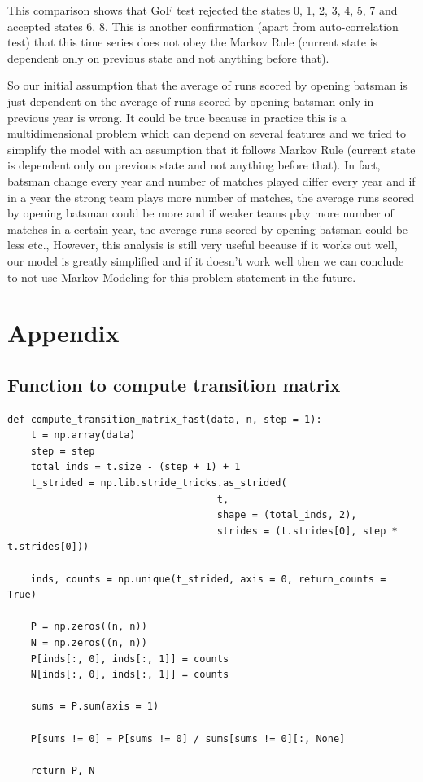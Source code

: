 \documentclass[a4paper, article, oneside, UKenglish]{memoir}
\newcommand{\0}{\mathbf{0}}
\newcommand{\1}{\mathbf{1}}
\begin{document}
This comparison shows that GoF test rejected the states 0, 1, 2, 3, 4, 5, 7 and accepted states 6, 8. This is another confirmation (apart from auto-correlation test) that this time series does not obey the Markov Rule (current state is dependent only on previous state and not anything before that).

So our initial assumption that the average of runs scored by opening batsman is just dependent on the average of runs scored by opening batsman only in previous year is wrong. It could be true because in practice this is a multidimensional problem which can depend on several features and we tried to simplify the model with an assumption that it follows Markov Rule (current state is dependent only on previous state and not anything before that). In fact, batsman change every year and number of matches played differ every year and if in a year the strong team plays more number of matches, the average runs scored by opening batsman could be more and if weaker teams play more number of matches in a certain year, the average runs scored by opening batsman could be less etc., However, this analysis is still very useful because if it works out well, our model is greatly simplified and if it doesn't work well then we can conclude to not use Markov Modeling for this problem statement in the future.


\chapter{Appendix}

\section{Function to compute transition matrix}
\label{sec:tm}
\begin{verbatim}
def compute_transition_matrix_fast(data, n, step = 1):
    t = np.array(data)
    step = step
    total_inds = t.size - (step + 1) + 1
    t_strided = np.lib.stride_tricks.as_strided(
                                    t,
                                    shape = (total_inds, 2),
                                    strides = (t.strides[0], step * t.strides[0]))
    
    inds, counts = np.unique(t_strided, axis = 0, return_counts = True)

    P = np.zeros((n, n))
    N = np.zeros((n, n))
    P[inds[:, 0], inds[:, 1]] = counts
    N[inds[:, 0], inds[:, 1]] = counts
    
    sums = P.sum(axis = 1)
    
    P[sums != 0] = P[sums != 0] / sums[sums != 0][:, None]
    
    return P, N
\end{verbatim}
\end{document}
